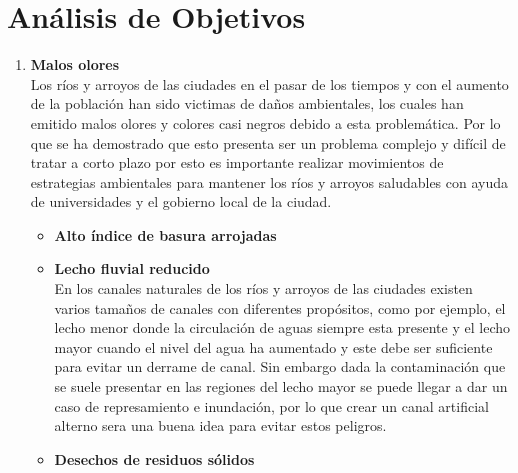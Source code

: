 \section{Análisis de Objetivos}


\begin{enumerate}
	\item \textbf{Malos olores}\\
	      Los ríos y arroyos de las ciudades en el pasar de los tiempos y con el aumento de la población han sido victimas de daños ambientales, los cuales han emitido malos olores y colores casi negros debido a esta problemática. Por lo que se ha demostrado que esto presenta ser un problema complejo y difícil de tratar a corto plazo por esto es importante realizar movimientos de estrategias ambientales para mantener los ríos y arroyos saludables con ayuda de universidades y el gobierno local de la ciudad.
	      \begin{itemize}
		      \item \textbf{Alto índice de basura arrojadas}\\

		      \item \textbf{Lecho fluvial reducido} \\
		            En los canales naturales de los ríos y arroyos de las ciudades existen varios tamaños de canales con diferentes propósitos, como por ejemplo, el lecho menor donde la circulación de aguas siempre esta presente y el lecho mayor cuando el nivel del agua ha aumentado y este debe ser suficiente para evitar un derrame de canal. Sin embargo dada la contaminación que se suele presentar en las regiones del lecho mayor se puede llegar a dar un caso de represamiento e inundación, por lo que crear un canal artificial alterno sera una buena idea para evitar estos peligros.
		      \item \textbf{Desechos de residuos sólidos}\\


\end{itemize}
\end{enumerate}
